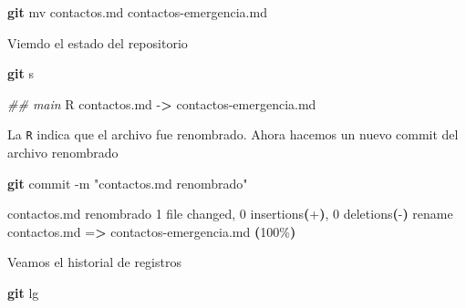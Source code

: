 \documentclass[
]{book}
\newenvironment{Shaded}{\begin{snugshade}}{\end{snugshade}}
\newcommand{\AttributeTok}[1]{\textcolor[rgb]{0.13,0.29,0.53}{#1}}
\newcommand{\CommentTok}[1]{\textcolor[rgb]{0.56,0.35,0.01}{\textit{#1}}}
\newcommand{\ErrorTok}[1]{\textcolor[rgb]{0.64,0.00,0.00}{\textbf{#1}}}
\newcommand{\ExtensionTok}[1]{#1}
\newcommand{\FunctionTok}[1]{\textcolor[rgb]{0.13,0.29,0.53}{\textbf{#1}}}
\newcommand{\KeywordTok}[1]{\textcolor[rgb]{0.13,0.29,0.53}{\textbf{#1}}}
\newcommand{\NormalTok}[1]{#1}
\newcommand{\OperatorTok}[1]{\textcolor[rgb]{0.81,0.36,0.00}{\textbf{#1}}}
\newcommand{\StringTok}[1]{\textcolor[rgb]{0.31,0.60,0.02}{#1}}
\begin{document}
\begin{Shaded}
\begin{Highlighting}[]
\FunctionTok{git}\NormalTok{ mv contactos.md contactos{-}emergencia.md}
\end{Highlighting}
\end{Shaded}

Viemdo el estado del repositorio

\begin{Shaded}
\begin{Highlighting}[]
\FunctionTok{git}\NormalTok{ s}
\end{Highlighting}
\end{Shaded}

\begin{Shaded}
\begin{Highlighting}[]
\CommentTok{\#\# main}
\ExtensionTok{R}\NormalTok{  contactos.md }\AttributeTok{{-}}\OperatorTok{\textgreater{}}\NormalTok{ contactos{-}emergencia.md}
\end{Highlighting}
\end{Shaded}

La \texttt{R} indica que el archivo fue renombrado. Ahora hacemos un nuevo commit del archivo renombrado

\begin{Shaded}
\begin{Highlighting}[]
\FunctionTok{git}\NormalTok{ commit }\AttributeTok{{-}m} \StringTok{"contactos.md renombrado"}
\end{Highlighting}
\end{Shaded}

\begin{Shaded}
\begin{Highlighting}[]
\ExtensionTok{[main}\NormalTok{ 2d05f6e] contactos.md renombrado}
 \ExtensionTok{1}\NormalTok{ file changed, 0 insertions}\ErrorTok{(}\ExtensionTok{+}\KeywordTok{)}\ExtensionTok{,}\NormalTok{ 0 deletions}\ErrorTok{(}\ExtensionTok{{-}}\KeywordTok{)}
 \ExtensionTok{rename}\NormalTok{ contactos.md =}\OperatorTok{\textgreater{}}\NormalTok{ contactos{-}emergencia.md }\ErrorTok{(}\ExtensionTok{100\%}\KeywordTok{)}
\end{Highlighting}
\end{Shaded}

Veamos el historial de registros

\begin{Shaded}
\begin{Highlighting}[]
\FunctionTok{git}\NormalTok{ lg}
\end{Highlighting}
\end{Shaded}
\end{document}
